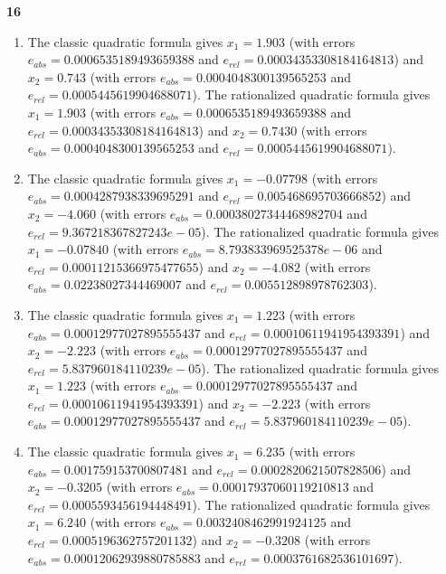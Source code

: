 \documentclass{article}
\begin{document}
\textbf{16}
\begin{enumerate}
    \item 
    The classic quadratic formula gives $x_1 = 1.903$ (with errors $e_{abs} = 0.0006535189493659388$ and $e_{rel} = 0.00034353308184164813$) and $x_2 = 0.743$ (with errors $e_{abs} = 0.0004048300139565253$ and $e_{rel} = 0.0005445619904688071$). The rationalized quadratic formula gives $x_1 = 1.903$ (with errors $e_{abs} = 0.0006535189493659388$ and $e_{rel} = 0.00034353308184164813$) and $x_2 = 0.7430$ (with errors $e_{abs} = 0.0004048300139565253$ and $e_{rel} = 0.0005445619904688071$).

    \item
    The classic quadratic formula gives $x_1 = -0.07798$ (with errors $e_{abs} = 0.0004287938339695291$ and $e_{rel} = 0.005468695703666852$) and $x_2 = -4.060$ (with errors $e_{abs} = 0.00038027344468982704$ and $e_{rel} = 9.367218367827243e-05$). The rationalized quadratic formula gives $x_1 = -0.07840$ (with errors $e_{abs} = 8.793833969525378e-06$ and $e_{rel} = 0.00011215366975477655$) and $x_2 = -4.082$ (with errors $e_{abs} = 0.02238027344469007$ and $e_{rel} = 0.005512898978762303$).

    \item
The classic quadratic formula gives $x_1 = 1.223$ (with errors $e_{abs} = 0.00012977027895555437$ and $e_{rel} = 0.00010611941954393391$) and $x_2 = -2.223$ (with errors $e_{abs} = 0.00012977027895555437$ and $e_{rel} = 5.837960184110239e-05$). The rationalized quadratic formula gives $x_1 = 1.223$ (with errors $e_{abs} = 0.00012977027895555437$ and $e_{rel} = 0.00010611941954393391$) and $x_2 = -2.223$ (with errors $e_{abs} = 0.00012977027895555437$ and $e_{rel} = 5.837960184110239e-05$).

\item
The classic quadratic formula gives $x_1 = 6.235$ (with errors $e_{abs} = 0.001759153700807481$ and $e_{rel} = 0.0002820621507828506$) and 
$x_2 = -0.3205$ (with errors $e_{abs} = 0.00017937060119210813$ and $e_{rel} = 0.0005593456194448491$). The rationalized quadratic formula gives $x_1 = 6.240$ (with errors $e_{abs} = 0.0032408462991924125$ and $e_{rel} = 0.0005196362757201132$) and $x_2 = -0.3208$ (with errors $e_{abs} = 0.00012062939880785883$ and $e_{rel} = 0.0003761682536101697$).
\end{enumerate}

\end{document}
